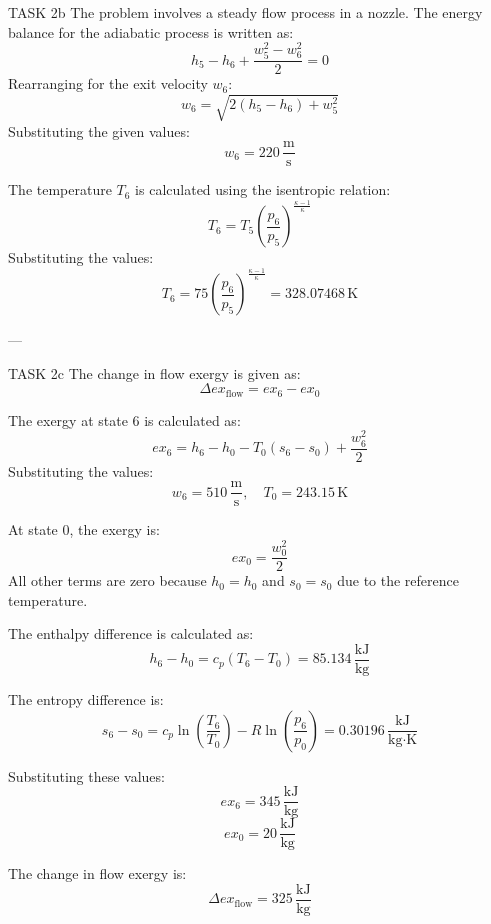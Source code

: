 TASK 2b  
The problem involves a steady flow process in a nozzle. The energy balance for the adiabatic process is written as:  
\[
h_5 - h_6 + \frac{w_5^2 - w_6^2}{2} = 0
\]  
Rearranging for the exit velocity \( w_6 \):  
\[
w_6 = \sqrt{2(h_5 - h_6) + w_5^2}
\]  
Substituting the given values:  
\[
w_6 = 220 \, \frac{\text{m}}{\text{s}}
\]  

The temperature \( T_6 \) is calculated using the isentropic relation:  
\[
T_6 = T_5 \left( \frac{p_6}{p_5} \right)^{\frac{\kappa - 1}{\kappa}}
\]  
Substituting the values:  
\[
T_6 = 75 \left( \frac{p_6}{p_5} \right)^{\frac{\kappa - 1}{\kappa}} = 328.07468 \, \text{K}
\]  

---

TASK 2c  
The change in flow exergy is given as:  
\[
\Delta ex_{\text{flow}} = ex_6 - ex_0
\]  

The exergy at state 6 is calculated as:  
\[
ex_6 = h_6 - h_0 - T_0 (s_6 - s_0) + \frac{w_6^2}{2}
\]  
Substituting the values:  
\[
w_6 = 510 \, \frac{\text{m}}{\text{s}}, \quad T_0 = 243.15 \, \text{K}
\]  

At state 0, the exergy is:  
\[
ex_0 = \frac{w_0^2}{2}
\]  
All other terms are zero because \( h_0 = h_0 \) and \( s_0 = s_0 \) due to the reference temperature.  

The enthalpy difference is calculated as:  
\[
h_6 - h_0 = c_p (T_6 - T_0) = 85.134 \, \frac{\text{kJ}}{\text{kg}}
\]  

The entropy difference is:  
\[
s_6 - s_0 = c_p \ln \left( \frac{T_6}{T_0} \right) - R \ln \left( \frac{p_6}{p_0} \right) = 0.30196 \, \frac{\text{kJ}}{\text{kg·K}}
\]  

Substituting these values:  
\[
ex_6 = 345 \, \frac{\text{kJ}}{\text{kg}}
\]  
\[
ex_0 = 20 \, \frac{\text{kJ}}{\text{kg}}
\]  

The change in flow exergy is:  
\[
\Delta ex_{\text{flow}} = 325 \, \frac{\text{kJ}}{\text{kg}}
\]  